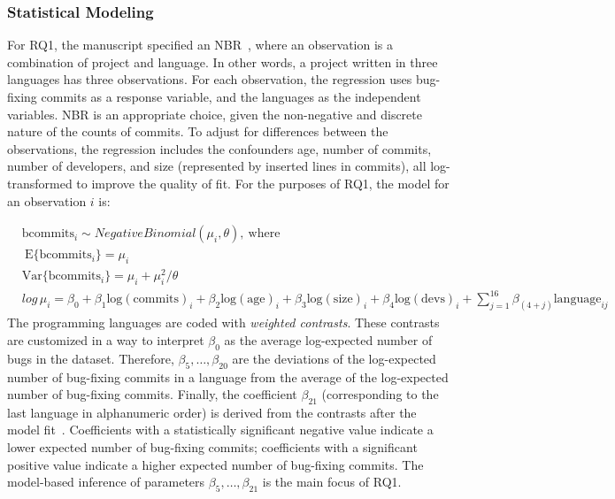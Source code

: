 \documentclass[acmsmall]{acmart}
\begin{document}
\subsubsection{Statistical Modeling}

For RQ1, the manuscript specified an NBR~\cite{faraway}, where an
observation is a combination of project and language. In other words, a
project written in three languages has three observations.  For each
observation, the regression uses bug-fixing commits as a response variable,
and the languages as the independent variables.  NBR is an appropriate
choice, given the non-negative and discrete nature of the counts of
commits. To adjust for differences between the observations, the regression
includes the confounders age, number of commits, number of developers, and
size (represented by inserted lines in commits), all log-transformed to
improve the quality of fit. For the purposes of RQ1, the model for an
observation $i$ is:

\vspace{-3mm}
{\footnotesize\begin{eqnarray}
&\mathrm{bcommits}_i\sim\mathit{NegativeBinomial}(\mu_i,\theta),\ \mbox{where}&\nonumber\\
&\ \mathrm{E}\{\mathrm{bcommits}_i\}=\mu_i&\nonumber\\ 
&\mathrm{Var}\{\mathrm{bcommits}_i\}=\mu_i+\mu_i^2/\theta& \nonumber\\
& log\,\mu_i=\beta_0+\beta_1 \mathrm{log(commits)}_i+\beta_2 \mathrm{log(age)}_i+ \beta_3 \mathrm{log(size)}_i+\beta_4 \mathrm{log(devs)}_i+\sum_{j=1}^{16}\beta_{(4+j)}\mathrm{language}_{ij} & \nonumber 
\end{eqnarray}}
\noindent The programming languages are coded with {\it weighted
  contrasts}. These contrasts are customized in a way to interpret
$\beta_0$ as the average log-expected number of bugs in the dataset.
Therefore, $\beta_5,\ldots,\beta_{20}$ are the deviations of the
log-expected number of bug-fixing commits in a language from the average of
the log-expected number of bug-fixing commits. Finally,
the coefficient $\beta_{21}$ (corresponding to the last language in
alphanumeric order) is derived from the contrasts after the model
fit~\cite{knnl}. Coefficients with a statistically significant negative
value indicate a lower expected number of bug-fixing commits; coefficients
with a significant positive value indicate a higher expected number of
bug-fixing commits.  The model-based inference of parameters
$\beta_5,\ldots,\beta_{21}$ is the main focus of RQ1.
\end{document}
